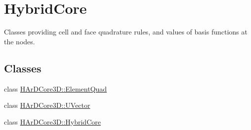 \hypertarget{group__HybridCore}{}\section{Hybrid\+Core}
\label{group__HybridCore}


Classes providing cell and face quadrature rules, and values of basis functions at the nodes.  


\subsection*{Classes}
\begin{DoxyCompactItemize}
\item 
class \hyperlink{classHArDCore3D_1_1ElementQuad}{H\+Ar\+D\+Core3\+D\+::\+Element\+Quad}
\item 
class \hyperlink{classHArDCore3D_1_1UVector}{H\+Ar\+D\+Core3\+D\+::\+U\+Vector}
\item 
class \hyperlink{classHArDCore3D_1_1HybridCore}{H\+Ar\+D\+Core3\+D\+::\+Hybrid\+Core}
\end{DoxyCompactItemize}

